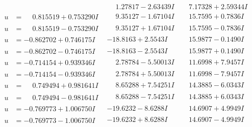 \documentclass[1p]{elsarticle_modified}
\theoremstyle{definition}
\begin{document}
$$\begin{array}{c|c|c}
 & \phantom{-}1.27817 - 2.63439 I & \phantom{-}7.17328 + 2.59344 I \\ \hline\begin{aligned}
u &= \phantom{-}0.815519 + 0.753290 I\end{aligned}
 & \phantom{-}9.35127 - 1.67104 I & \phantom{-}15.7595 + 0.7836 I \\ \hline\begin{aligned}
u &= \phantom{-}0.815519 - 0.753290 I\end{aligned}
 & \phantom{-}9.35127 + 1.67104 I & \phantom{-}15.7595 - 0.7836 I \\ \hline\begin{aligned}
u &= -0.862702 + 0.746175 I\end{aligned}
 & -18.8163 + 2.5543 I & \phantom{-}15.9877 - 0.1490 I \\ \hline\begin{aligned}
u &= -0.862702 - 0.746175 I\end{aligned}
 & -18.8163 - 2.5543 I & \phantom{-}15.9877 + 0.1490 I \\ \hline\begin{aligned}
u &= -0.714154 + 0.939346 I\end{aligned}
 & \phantom{-}2.78784 - 5.50013 I & \phantom{-}11.6998 + 7.9457 I \\ \hline\begin{aligned}
u &= -0.714154 - 0.939346 I\end{aligned}
 & \phantom{-}2.78784 + 5.50013 I & \phantom{-}11.6998 - 7.9457 I \\ \hline\begin{aligned}
u &= \phantom{-}0.749494 + 0.981641 I\end{aligned}
 & \phantom{-}8.65288 + 7.54251 I & \phantom{-}14.3885 - 6.0343 I \\ \hline\begin{aligned}
u &= \phantom{-}0.749494 - 0.981641 I\end{aligned}
 & \phantom{-}8.65288 - 7.54251 I & \phantom{-}14.3885 + 6.0343 I \\ \hline\begin{aligned}
u &= -0.769773 + 1.006750 I\end{aligned}
 & -19.6232 - 8.6288 I & \phantom{-}14.6907 + 4.9949 I \\ \hline\begin{aligned}
u &= -0.769773 - 1.006750 I\end{aligned}
 & -19.6232 + 8.6288 I & \phantom{-}14.6907 - 4.9949 I \\ \hline\begin{aligned}

\end{aligned}
\end{array}$$
\end{document}
